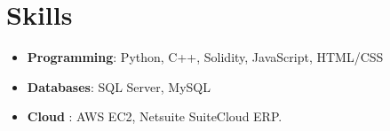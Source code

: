 \documentclass[letterpaper,11pt]{article}
\newcommand{\resumeItem}[2]{
\item\small{
	\textbf{#1}{: #2 \vspace{-2pt}}
}
}
\newcommand{\resumeSubItem}[2]{\resumeItem{#1}{#2}\vspace{-4pt}}
\newcommand{\resumeSubHeadingListStart}{\begin{itemize}[leftmargin=*]}
\newcommand{\resumeSubHeadingListEnd}{\end{itemize}}
\begin{document}
\section{Skills}
\resumeSubHeadingListStart
\itemsep0em 
\item{
	\textbf{Programming}{: Python, C++, Solidity, JavaScript, HTML/CSS}
}
\item{
	\textbf{Databases}{: SQL Server, MySQL}
}
\item{
	\textbf{Cloud} {: AWS EC2, Netsuite SuiteCloud ERP.}
}
\resumeSubHeadingListEnd



\end{document}
